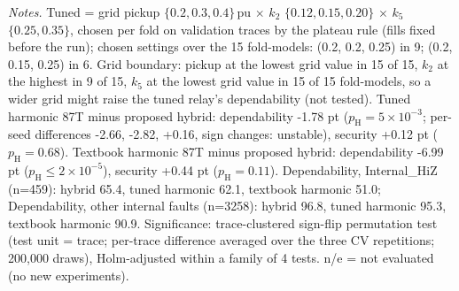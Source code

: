 \begin{table}[!htbp]\centering
\caption{Conventional relays on the benchmark data (dependability / security, \%): unrestrained dual-slope 87T, harmonic-restrained 87T with textbook settings, and harmonic-restrained 87T tuned on validation traces, against the proposed relay. Plant-A CV (3 seeds $\times$ 5 folds, common set), OOD (final scoring) and plant-B zero-shot.}\label{tab:C_conventional}
\small{}
\vspace{3pt}\par\raggedright\footnotesize\textit{Notes.} Tuned = grid pickup $\{0.2, 0.3, 0.4\}$\,pu $\times$ $k_2$ $\{0.12, 0.15, 0.20\}$ $\times$ $k_5$ $\{0.25, 0.35\}$, chosen per fold on validation traces by the plateau rule (fills fixed before the run); chosen settings over the 15 fold-models: (0.2, 0.2, 0.25) in 9; (0.2, 0.15, 0.25) in 6. Grid boundary: pickup at the lowest grid value in 15 of 15, $k_2$ at the highest in 9 of 15, $k_5$ at the lowest grid value in 15 of 15 fold-models, so a wider grid might raise the tuned relay's dependability (not tested). Tuned harmonic 87T minus proposed hybrid: dependability -1.78 pt ($p_{\mathrm{H}}=5\times10^{-3}$; per-seed differences -2.66, -2.82, +0.16, sign changes: unstable), security +0.12 pt ($p_{\mathrm{H}}=0.68$). Textbook harmonic 87T minus proposed hybrid: dependability -6.99 pt ($p_{\mathrm{H}}\le2\times10^{-5}$), security +0.44 pt ($p_{\mathrm{H}}=0.11$). Dependability, Internal\_HiZ (n=459): hybrid 65.4, tuned harmonic 62.1, textbook harmonic 51.0; Dependability, other internal faults (n=3258): hybrid 96.8, tuned harmonic 95.3, textbook harmonic 90.9. Significance: trace-clustered sign-flip permutation test (test unit = trace; per-trace difference averaged over the three CV repetitions; 200{,}000 draws), Holm-adjusted within a family of 4 tests. n/e = not evaluated (no new experiments).
\end{table}